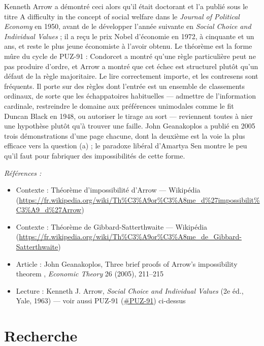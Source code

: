 \documentclass[11pt]{article}
\newenvironment{refs}{\par\small\noindent\emph{Références :}\begin{itemize}\setlength\itemsep{0pt}}{\end{itemize}\normalsize}
\begin{document}
\noindent Kenneth Arrow a démontré ceci alors qu'il était doctorant et l'a publié
sous le titre \og{} A difficulty in the concept of social welfare \fg{} dans le \textit{Journal of
Political Economy} en 1950, avant de le développer l'année suivante en \textit{Social Choice
and Individual Values} ; il a reçu le prix Nobel d'économie en 1972, à cinquante et un
ans, et reste le plus jeune économiste à l'avoir obtenu. Le théorème est la forme mûre du
cycle de PUZ-91 : Condorcet a montré qu'une règle particulière peut ne pas produire d'ordre,
et Arrow a montré que cet échec est structurel plutôt qu'un défaut de la règle majoritaire.
Le lire correctement importe, et les contresens sont fréquents. Il porte sur des règles dont
l'entrée est un ensemble de classements ordinaux, de sorte que les échappatoires
habituelles --- admettre de l'information cardinale, restreindre le domaine aux préférences
unimodales comme le fit Duncan Black en 1948, ou autoriser le tirage au sort --- reviennent
toutes à nier une hypothèse plutôt qu'à trouver une faille. John Geanakoplos a publié en 2005
trois démonstrations d'une page chacune, dont la deuxième est la voie la plus efficace vers
la question (a) ; le paradoxe libéral d'Amartya Sen montre le peu qu'il faut pour fabriquer
des impossibilités de cette forme.

\begin{refs}
\item Contexte : Théorème d'impossibilité d'Arrow --- Wikipédia (\url{https://fr.wikipedia.org/wiki/Th%C3%A9or%C3%A8me_d%27impossibilit%C3%A9_d%27Arrow})
\item Contexte : Théorème de Gibbard-Satterthwaite --- Wikipédia (\url{https://fr.wikipedia.org/wiki/Th%C3%A9or%C3%A8me_de_Gibbard-Satterthwaite})
\item Article : John Geanakoplos, \og{} Three brief proofs of Arrow's impossibility theorem \fg{}, \textit{Economic Theory} 26 (2005), 211--215
\item Lecture : Kenneth J. Arrow, \textit{Social Choice and Individual Values} (2e éd., Yale, 1963) --- voir aussi PUZ-91 (\url{#PUZ-91}) ci-dessus
\end{refs}

\bigskip


\section*{Recherche}
\end{document}
